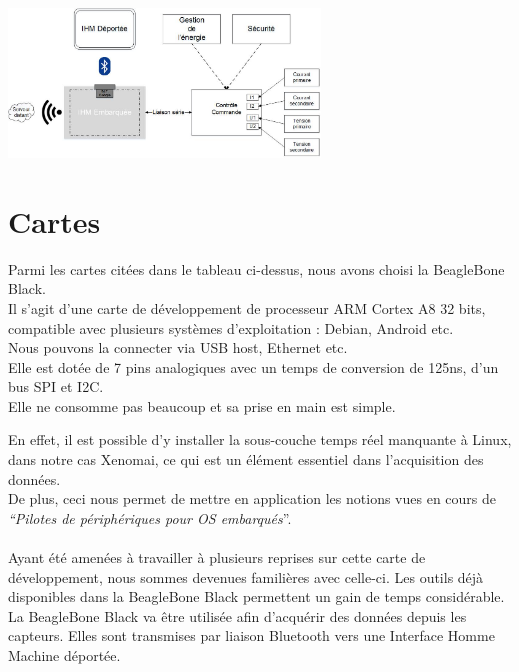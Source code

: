 \documentclass{report}
\begin{document}
\begin{center}
 \includegraphics[height=150]{./Schema/sch_arch_sys_2.jpg}
\end{center}


\section{Cartes}

Parmi les cartes cit\'{e}es dans le tableau ci-dessus, nous avons choisi la BeagleBone Black. \\



Il s’agit d’une carte de d\'{e}veloppement de processeur ARM Cortex A8 32 bits, compatible
avec plusieurs syst\`{e}mes d’exploitation : Debian, Android etc.\\
Nous pouvons la connecter via USB host, Ethernet etc.\\
Elle est dot\'{e}e de 7 pins analogiques avec un temps de conversion de 125ns, d’un bus SPI et
I2C.\\
Elle ne consomme pas beaucoup et sa prise en main est simple.



En effet, il est possible d’y installer la sous-couche temps r\'{e}el manquante \`{a} Linux, dans notre
cas Xenomai, ce qui est un \'{e}l\'{e}ment essentiel dans l’acquisition des donn\'{e}es.\\
De plus, ceci nous permet de mettre en application les notions vues en cours de \textit{“Pilotes de
p\'{e}riph\'{e}riques pour OS embarqu\'{e}s}”.\\ \\

Ayant \'{e}t\'{e} amen\'{e}es \`{a} travailler \`{a} plusieurs reprises sur cette carte de d\'{e}veloppement, nous
sommes devenues famili\`{e}res avec celle-ci. Les outils d\'{e}j\`{a} disponibles dans la BeagleBone
Black permettent un gain de temps consid\'{e}rable. La BeagleBone Black va \^{e}tre utilis\'{e}e afin
d'acqu\'{e}rir des donn\'{e}es depuis les capteurs. Elles sont transmises par liaison Bluetooth vers
une Interface Homme Machine d\'{e}port\'{e}e.\\ \\
\end{document}

